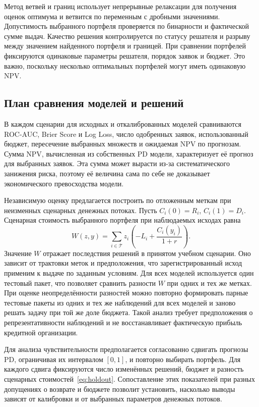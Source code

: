 \documentclass{misisarticle}
\begin{document}
Метод ветвей и границ использует непрерывные релаксации для получения оценок оптимума и ветвится по переменным с дробными значениями. Допустимость выбранного портфеля проверяется по бинарности и фактической сумме выдач. Качество решения контролируется по статусу решателя и разрыву между значением найденного портфеля и границей. При сравнении портфелей фиксируются одинаковые параметры решателя, порядок заявок и бюджет. Это важно, поскольку несколько оптимальных портфелей могут иметь одинаковую NPV.

\subsection{План сравнения моделей и решений}

В каждом сценарии для исходных и откалиброванных моделей сравниваются ROC-AUC, Brier Score и Log Loss, число одобренных заявок, использованный бюджет, пересечение выбранных множеств и ожидаемая NPV по прогнозам. Сумма NPV, вычисленная из собственных PD модели, характеризует её прогноз для выбранных заявок. Эта сумма может вырасти из-за систематического занижения риска, поэтому её величина сама по себе не доказывает экономического превосходства модели.

Независимую оценку предлагается построить по отложенным меткам при неизменных сценарных денежных потоках. Пусть $C_i(0)=R_i$, $C_i(1)=D_i$. Сценарная стоимость выбранного портфеля при наблюдаемых исходах равна
\begin{equation}
  W(z,y)=\sum_{i\in\mathcal T}z_i
      \left(-L_i+\frac{C_i(y_i)}{1+r}\right).
  \label{eq:holdout}
\end{equation}
Значение $W$ отражает последствия решений в принятом учебном сценарии. Оно зависит от трактовки меток и предположения, что зарегистрированный исход применим к выдаче по заданным условиям. Для всех моделей используется один тестовый пакет, что позволяет сравнить разности $W$ при одних и тех же метках. При оценке неопределённости разностей можно повторно формировать парные тестовые пакеты из одних и тех же наблюдений для всех моделей и заново решать задачу при той же доле бюджета. Такой анализ требует предположения о репрезентативности наблюдений и не восстанавливает фактическую прибыль кредитной организации.

Для анализа чувствительности предполагается согласованно сдвигать прогнозы PD, ограничивая их интервалом $[0,1]$, и повторно выбирать портфель. Для каждого сдвига фиксируются число изменённых решений, бюджет и разность сценарных стоимостей~\eqref{eq:holdout}. Сопоставление этих показателей при разных допущениях о возврате и бюджете позволит установить, насколько выводы зависят от калибровки и от выбранных параметров денежных потоков.
\end{document}
